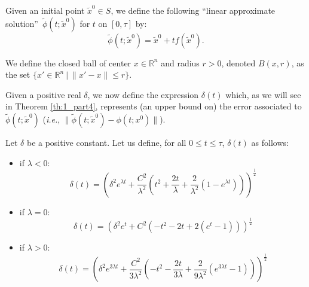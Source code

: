 Given an  initial point $\tilde{x}^0\in S$, we define the following ``linear approximate solution''~$\tilde{\phi}(t;\tilde{x}^0)$ for $t$ on $[0,\tau]$ by:
\begin{equation}
\tilde{\phi}(t;\tilde{x}^0) = \tilde  x^0 + t f(\tilde  x^0).
\label{eq:grossier_part4}
\end{equation}

We define the closed ball of center $x\in\mathbb{R}^n$ and radius $r>0$, denoted $B(x,r)$, as the set $\{x'\in\mathbb{R}^n \ |\ \|x'-x\| \leq r\}$.


Given a positive real $\delta$, we now define the expression $\delta(t)$
which, as we will see in Theorem \ref{th:1_part4}, represents (an upper bound on)
the error associated to $\tilde{\phi}(t; \tilde{x}^0)$
(\textit{i.e.}, $\|\tilde{\phi}(t; \tilde{x}^0)-\phi(t; x^0)\|$).

\begin{definition}\label{def:4_part4}
Let $\delta$ be a positive constant. Let us define, for all $0\leq t\leq \tau$,
$\delta(t)$ as follows:
\begin{itemize}
\item  if $\lambda <0$:
$$\delta(t)=\left(\delta^2 e^{\lambda t}+
 \frac{C^2}{\lambda^2}\left(t^2+\frac{2 t}{\lambda}+\frac{2}{\lambda^2}\left(1- e^{\lambda t} \right)\right)\right)^{\frac{1}{2}}$$
%

\item if $\lambda = 0:$
$$\delta(t)= \left( \delta^2 e^{t} + C^2 (- t^2 - 2t + 2 (e^t - 1)) \right)^\frac{1}{2}$$





\item if $\lambda > 0:$
$$\delta(t)=\left(\delta^2 e^{3\lambda t}+
\frac{C^2}{3\lambda^2}\left(-t^2-\frac{2t}{3\lambda}+\frac{2}{9\lambda^2}
\left(e^{3\lambda t}-1\right)\right)\right)^{\frac{1}{2}}$$
%
\end{itemize}
\end{definition}

